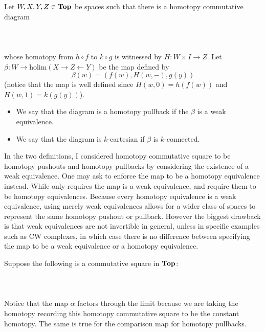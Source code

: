 \begin{defn}\label{defn:HpushSq} Let $W,X,Y,Z\in\bold{Top}$ be spaces such that there is a homotopy commutative diagram  
 \\~\\  \\~\\
whose homotopy from $h\circ f$ to $k\circ g$ is witnessed by $H:W\times I\to Z$. Let $\beta:W\to\text{holim}(X\rightarrow Z\leftarrow Y)$ be the map defined by $$\beta(w)=(f(w),H(w,-),g(y))$$ (notice that the map is well defined since $H(w,0)=h(f(w))$ and $H(w,1)=k(g(y))$). 
\begin{itemize}
\item We say that the diagram is a homotopy pullback if the $\beta$ is a weak equivalence. 
\item We say that the diagram is $k$-cartesian if $\beta$ is $k$-connected. 
\end{itemize}
\end{defn}

In the two definitions, I considered homotopy commutative square to be homotopy pushouts and homotopy pullbacks by considering the existence of a weak equivalence. One may ask to enforce the map to be a homotopy equivalence instead. While \cite{CHT} only requires the map is a weak equivalence, \cite{IHT} and \cite{MCHT} require them to be homotopy equivalences. Because every homotopy equivalence is a weak equivalence, using merely weak equivalences allows for a wider class of spaces to represent the same homotopy pushout or pullback. However the biggest drawback is that weak equivalences are not invertible in general, unless in specific examples such as CW complexes, in which case there is no difference between specifying the map to be a weak equivalence or a homotopy equivalence. 

Suppose the following is a commutative square in $\bold{Top}$:  
 \\~\\  \\~\\
Notice that the map $\alpha$ factors through the limit because we are taking the homotopy recording this homotopy commutative square to be the constant homotopy. The same is true for the comparison map for homotopy pullbacks. 

